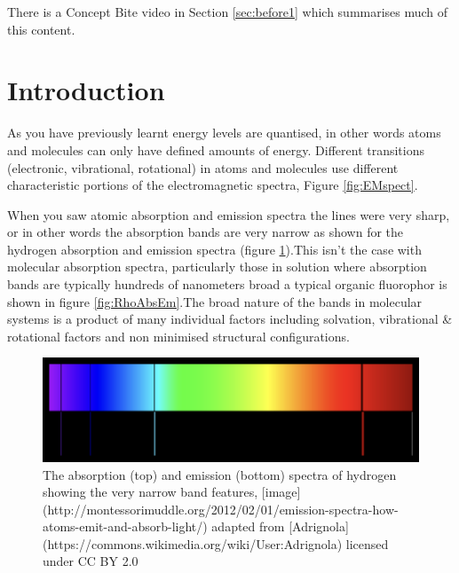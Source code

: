 \documentclass[
]{book}
\begin{document}
There is a Concept Bite video in Section \ref{sec:before1} which summarises much of this content.

\hypertarget{sec:AbsIntro}{%
\section{Introduction}\label{sec:AbsIntro}}

As you have previously learnt energy levels are quantised, in other words atoms and molecules can only have defined amounts of energy. Different transitions (electronic, vibrational, rotational) in atoms and molecules use different characteristic portions of the electromagnetic spectra, Figure \ref{fig:EMspect}.

When you saw atomic absorption and emission spectra the lines were very sharp, or in other words the absorption bands are very narrow as shown for the hydrogen absorption and emission spectra (figure \ref{fig:HAbsEm}).This isn't the case with molecular absorption spectra, particularly those in solution where absorption bands are typically hundreds of nanometers broad a typical organic fluorophor is shown in figure \ref{fig:RhoAbsEm}.The broad nature of the bands in molecular systems is a product of many individual factors including solvation, vibrational \& rotational factors and non minimised structural configurations.

\begin{figure}

{\centering \includegraphics[width=0.7\linewidth]{images/HAbsEm} 

}

\caption{The absorption (top) and emission (bottom) spectra of hydrogen showing the very narrow band features, [image](http://montessorimuddle.org/2012/02/01/emission-spectra-how-atoms-emit-and-absorb-light/) adapted from [Adrignola](https://commons.wikimedia.org/wiki/User:Adrignola) licensed under CC BY 2.0}\label{fig:HAbsEm}
\end{figure}
\end{document}

